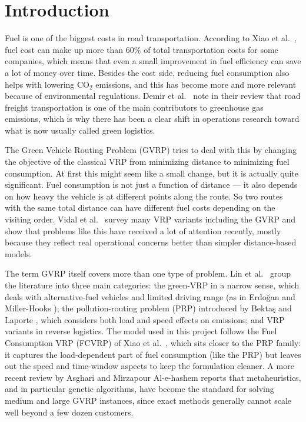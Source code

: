 \documentclass [a4paper, 11pt, titlepage] {article}
\begin{document}
\newpage

\section{Introduction}
\label{sec:intro}

Fuel is one of the biggest costs in road transportation. According to Xiao et al.\ \cite{xiao2012}, fuel cost can make up more than 60\% of total transportation costs for some companies, which means that even a small improvement in fuel efficiency can save a lot of money over time. Besides the cost side, reducing fuel consumption also helps with lowering CO$_2$ emissions, and this has become more and more relevant because of environmental regulations. Demir et al.\ \cite{demir2014} note in their review that road freight transportation is one of the main contributors to greenhouse gas emissions, which is why there has been a clear shift in operations research toward what is now usually called green logistics.

The Green Vehicle Routing Problem (GVRP) tries to deal with this by changing the objective of the classical VRP from minimizing distance to minimizing fuel consumption. At first this might seem like a small change, but it is actually quite significant. Fuel consumption is not just a function of distance --- it also depends on how heavy the vehicle is at different points along the route. So two routes with the same total distance can have different fuel costs depending on the visiting order. Vidal et al.\ \cite{vidal2020} survey many VRP variants including the GVRP and show that problems like this have received a lot of attention recently, mostly because they reflect real operational concerns better than simpler distance-based models.

The term GVRP itself covers more than one type of problem. Lin et al.\ \cite{lin2014} group the literature into three main categories: the green-VRP in a narrow sense, which deals with alternative-fuel vehicles and limited driving range (as in Erdoğan and Miller-Hooks \cite{erdogan2012}); the pollution-routing problem (PRP) introduced by Bektaş and Laporte \cite{bektas2011}, which considers both load and speed effects on emissions; and VRP variants in reverse logistics. The model used in this project follows the Fuel Consumption VRP (FCVRP) of Xiao et al.\ \cite{xiao2012}, which sits closer to the PRP family: it captures the load-dependent part of fuel consumption (like the PRP) but leaves out the speed and time-window aspects to keep the formulation cleaner. A more recent review by Asghari and Mirzapour Al-e-hashem \cite{asghari2021} reports that metaheuristics, and in particular genetic algorithms, have become the standard for solving medium and large GVRP instances, since exact methods generally cannot scale well beyond a few dozen customers.
\end{document}
